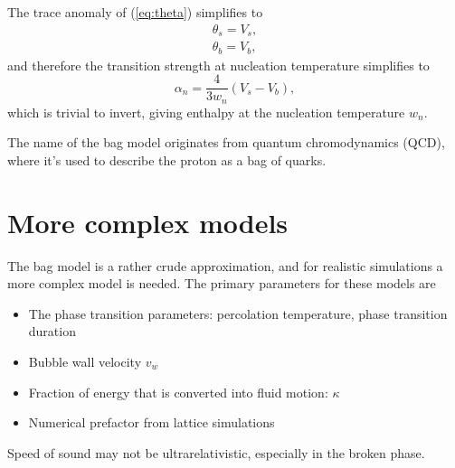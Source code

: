 The trace anomaly of (\ref{eq:theta}) simplifies to
\begin{align}
\theta_s = V_s, \\
\theta_b = V_b,
\end{align}
and therefore the transition strength at nucleation temperature simplifies to
\begin{equation}
\alpha_n = \frac{4}{3 w_n} (V_s - V_b),
\label{eq:alpha_n_bag}
\end{equation}
which is trivial to invert, giving enthalpy at the nucleation temperature $w_n$.

The name of the bag model originates from quantum chromodynamics (QCD), where it's used to describe the proton as a bag of quarks.


\section{More complex models}
The bag model is a rather crude approximation, and for realistic simulations a more complex model is needed.
The primary parameters for these models are
\begin{itemize}
    \item The phase transition parameters: percolation temperature, phase transition duration
    \item Bubble wall velocity $v_w$
    \item Fraction of energy that is converted into fluid motion: $\kappa$
    \item Numerical prefactor from lattice simulations
\end{itemize}

Speed of sound may not be ultrarelativistic, especially in the broken phase.

